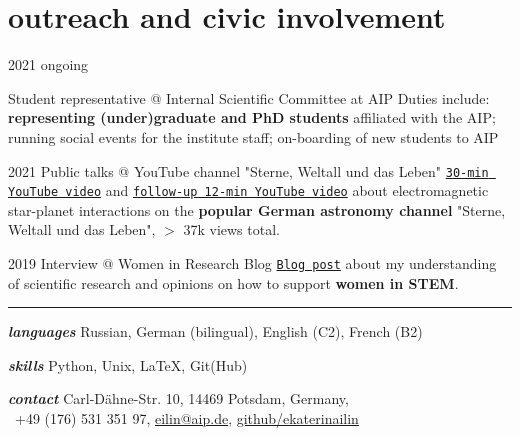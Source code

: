 \documentclass[9.5pt]{k-cv} %
\begin{document}
\section{outreach and civic involvement}
\begin{entrylist}
\entry
{2021 \to ongoing}

{Student representative @ Internal Scientific Committee at AIP}
{}
{Duties include: \textbf{representing (under)graduate and PhD students} affiliated with the AIP; running social events for the institute staff; on-boarding of new students to AIP}

\entry
{2021}
{Public talks @ YouTube channel "Sterne, Weltall und das Leben"}
{}
{\texttt{\href{https://www.youtube.com/watch?v=LLHLobUifeY}{30-min YouTube video}} and \texttt{\href{https://www.youtube.com/watch?v=YRw_tIpspRw}{follow-up 12-min YouTube video}} about electromagnetic star-planet interactions on the \textbf{popular German astronomy channel} "Sterne, Weltall und das Leben", $>$ 37k views total.}

\entry
{2019}
{Interview @ Women in Research Blog}
{}
{\texttt{\href{https://womeninresearchblog.wordpress.com/2019/06/26/ekaterina-germany/}{Blog post}} about my understanding of scientific research and opinions on how to support \textbf{women in STEM}.}

\entry
\end{entrylist}

\textcolor{red}{ \rule{19cm}{1pt} }
 
\begin{entrylist}

\entry
{\Large{\textit{\textbf{languages}}}}
{Russian, German (bilingual), English (C2), French (B2)}
{}{}

\entry
{\Large{\textit{\textbf{skills}}}}
{Python, Unix, LaTeX, Git(Hub)}
{}{}

\entry
{\Large{\textit{\textbf{contact}}}}
{Carl-D\"ahne-Str. 10, 14469 Potsdam, Germany,\\~+49 (176) 531 351 97, \href{mailto:eilin@aip.de}{eilin@aip.de}, \href{https://github.com/ekaterinailin}{github/ekaterinailin}}
{}{}
\end{entrylist}
\end{document}
